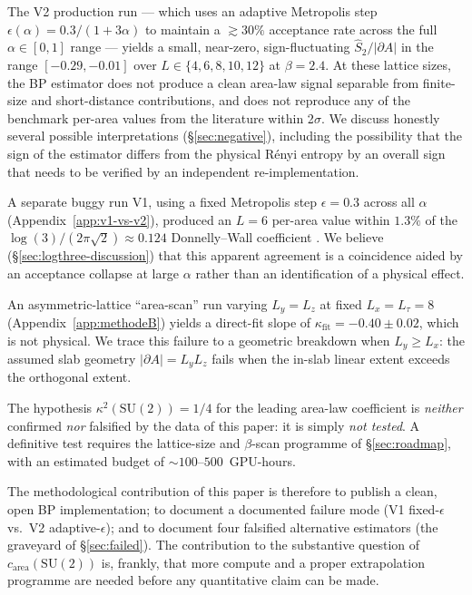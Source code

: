 \documentclass[11pt,a4paper]{article}
\theoremstyle{definition}
\newcommand{\SUtwo}{\mathrm{SU}(2)}
\begin{document}
The V2 production run --- which uses an adaptive Metropolis step
$\epsilon(\alpha) = 0.3/(1+3\alpha)$ to maintain a $\gtrsim 30\%$
acceptance rate across the full $\alpha \in [0,1]$ range --- yields a
small, near-zero, sign-fluctuating $\widehat S_2/|\partial A|$ in
the range $[-0.29, -0.01]$ over $L \in \{4,6,8,10,12\}$ at
$\beta = 2.4$. At these lattice sizes, the BP estimator does not
produce a clean area-law signal separable from finite-size and
short-distance contributions, and does not reproduce any of the
benchmark per-area values from the literature within 2$\sigma$. We
discuss honestly several possible interpretations
(\S\ref{sec:negative}), including the possibility that the sign of
the estimator differs from the physical Rényi entropy by an overall
sign that needs to be verified by an independent re-implementation.

A separate buggy run V1, using a fixed Metropolis step $\epsilon =
0.3$ across all $\alpha$ (Appendix~\ref{app:v1-vs-v2}), produced an
$L = 6$ per-area value within $1.3\%$ of the
$\log(3)/(2\pi\sqrt 2) \approx 0.124$ Donnelly--Wall coefficient
\cite{DonnellyWall2015}. We believe (\S\ref{sec:logthree-discussion})
that this apparent agreement is a coincidence aided by an acceptance
collapse at large $\alpha$ rather than an identification of a
physical effect.

An asymmetric-lattice ``area-scan'' run varying $L_y = L_z$ at
fixed $L_x = L_\tau = 8$ (Appendix~\ref{app:methodeB}) yields a
direct-fit slope of $\kappa_{\mathrm{fit}} = -0.40 \pm 0.02$, which
is not physical. We trace this failure to a geometric breakdown when
$L_y \ge L_x$: the assumed slab geometry $|\partial A| = L_y L_z$
fails when the in-slab linear extent exceeds the orthogonal extent.

The hypothesis $\kappa^{2}(\SUtwo) = 1/4$ \cite{KR2026} for the
leading area-law coefficient is \emph{neither} confirmed \emph{nor}
falsified by the data of this paper: it is simply \emph{not tested}.
A definitive test requires the lattice-size and $\beta$-scan
programme of \S\ref{sec:roadmap}, with an estimated budget of
$\sim 100$--$500$~GPU-hours.

The methodological contribution of this paper is therefore to
publish a clean, open BP implementation; to document a documented
failure mode (V1 fixed-$\epsilon$ vs.\ V2 adaptive-$\epsilon$); and
to document four falsified alternative estimators (the graveyard of
\S\ref{sec:failed}). The contribution to the substantive question of
$c_{\mathrm{area}}(\SUtwo)$ is, frankly, that more compute and a
proper extrapolation programme are needed before any quantitative
claim can be made.
\end{document}
